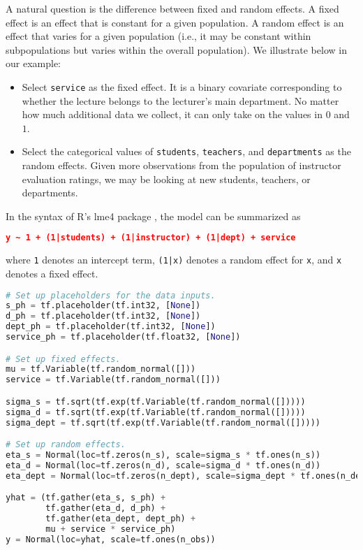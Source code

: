 A natural question is the difference between fixed and random effects.
A fixed effect is an effect that is constant for a given population. A
random effect is an effect that varies for a given population (i.e.,
it may be constant within subpopulations but varies within the overall
population). We illustrate below in our example:

\begin{itemize}
\item
Select \texttt{service} as the fixed effect. It is a binary covariate
corresponding to whether the lecture belongs to the lecturer's main
department. No matter how much additional data we collect, it
can only take on the values in $0$ and $1$.
\item
Select the categorical values of \texttt{students}, \texttt{teachers},
and \texttt{departments} as the random effects. Given more
observations from the population of instructor evaluation ratings, we
may be looking at new students, teachers, or departments.
\end{itemize}

In the syntax of R's lme4 package \citep{bates2015fitting}, the model
can be summarized as

\begin{lstlisting}[language=JSON]
y ~ 1 + (1|students) + (1|instructor) + (1|dept) + service
\end{lstlisting}
where \texttt{1} denotes an intercept term, \texttt{(1|x)} denotes a
random effect for  \texttt{x}, and \texttt{x} denotes a fixed effect.

\begin{lstlisting}[language=Python]
# Set up placeholders for the data inputs.
s_ph = tf.placeholder(tf.int32, [None])
d_ph = tf.placeholder(tf.int32, [None])
dept_ph = tf.placeholder(tf.int32, [None])
service_ph = tf.placeholder(tf.float32, [None])

# Set up fixed effects.
mu = tf.Variable(tf.random_normal([]))
service = tf.Variable(tf.random_normal([]))

sigma_s = tf.sqrt(tf.exp(tf.Variable(tf.random_normal([]))))
sigma_d = tf.sqrt(tf.exp(tf.Variable(tf.random_normal([]))))
sigma_dept = tf.sqrt(tf.exp(tf.Variable(tf.random_normal([]))))

# Set up random effects.
eta_s = Normal(loc=tf.zeros(n_s), scale=sigma_s * tf.ones(n_s))
eta_d = Normal(loc=tf.zeros(n_d), scale=sigma_d * tf.ones(n_d))
eta_dept = Normal(loc=tf.zeros(n_dept), scale=sigma_dept * tf.ones(n_dept))

yhat = (tf.gather(eta_s, s_ph) +
        tf.gather(eta_d, d_ph) +
        tf.gather(eta_dept, dept_ph) +
        mu + service * service_ph)
y = Normal(loc=yhat, scale=tf.ones(n_obs))
\end{lstlisting}

